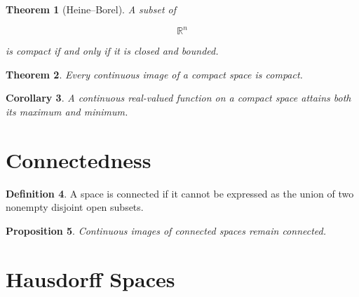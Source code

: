 \documentclass[11pt]{book}
\numberwithin{equation}{chapter}
\theoremstyle{definition}
\newtheorem{definition}{Definition}[chapter]
\theoremstyle{plain}
\newtheorem{theorem}[definition]{Theorem}
\newtheorem{proposition}[definition]{Proposition}
\newtheorem{corollary}[definition]{Corollary}
\begin{document}
\begin{theorem}[Heine--Borel]

A subset of

\[
\mathbb R^n
\]

is compact if and only if it is closed and bounded.

\end{theorem}


\begin{theorem}

Every continuous image of a compact space is compact.

\end{theorem}


\begin{corollary}

A continuous real-valued function on a compact space attains both its
maximum and minimum.

\end{corollary}


\section{Connectedness}

\begin{definition}

A space is connected if it cannot be expressed as the union of two
nonempty disjoint open subsets.

\end{definition}


\begin{proposition}

Continuous images of connected spaces remain connected.

\end{proposition}


\section{Hausdorff Spaces}
\end{document}
